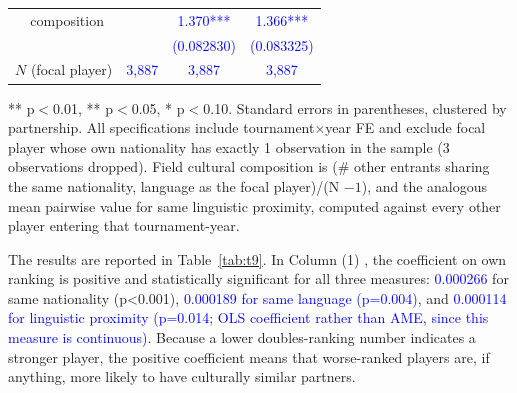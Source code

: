\documentclass[10pt]{article}
\begin{document}
\begin{table}[htbp]
\begin{threeparttable}
\begin{tabular}{llccc}
 & composition & & \textcolor{blue}{1.370***} & \textcolor{blue}{1.366***} \\
 & & & \textcolor{blue}{(0.082830)} & \textcolor{blue}{(0.083325)} \\
\midrule
\multicolumn{2}{l}{$N$ (focal player)} & \textcolor{blue}{3,887} & \textcolor{blue}{3,887} & \textcolor{blue}{3,887} \\
\bottomrule
\end{tabular}
\begin{tablenotes}
\small
\item *** p$<$0.01, ** p$<$0.05, * p$<$0.10. Standard errors in parentheses, clustered by partnership. All specifications include tournament$\times$year FE and exclude focal player whose own nationality has exactly 1 observation in the sample (3 observations dropped). Field cultural composition is (\# other entrants sharing the same nationality, language as the focal player)/(N $-1$), and the analogous mean pairwise value for same linguistic proximity, computed against every other player entering that tournament-year.
\end{tablenotes}
\end{threeparttable}
\end{table}
\FloatBarrier


The results are reported in Table~\ref{tab:t9}. In Column (1) , the coefficient on own ranking is positive and statistically significant for all three measures: \textcolor{blue}{0.000266} for same nationality (p<0.001), \textcolor{blue}{0.000189 for same language (p=0.004)}, and \textcolor{blue}{0.000114 for linguistic proximity (p=0.014; OLS coefficient rather than AME, since this measure is continuous)}. Because a lower doubles-ranking number indicates a stronger player, the positive coefficient means that worse-ranked players are, if anything, more likely to have culturally similar partners.
\end{document}
